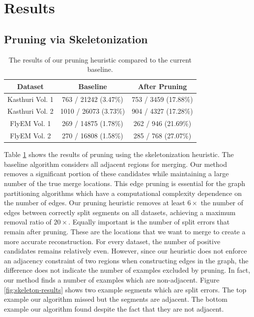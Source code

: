 \section{Results}

\subsection{Pruning via Skeletonization}

\begin{table}
	\centering
	\small
	\begin{tabular}{c c c} \hline
		\textbf{Dataset} & \textbf{Baseline} & \textbf{After Pruning} \\ \hline
		Kasthuri Vol. 1 & 763 / 21242 (3.47\%) & 753 / 3459 (17.88\%) \\
		Kasthuri Vol. 2 & 1010 / 26073 (3.73\%) & 904 / 4327 (17.28\%) \\
		FlyEM Vol. 1 & 269 / 14875 (1.78\%) & 262 / 946 (21.69\%) \\
		FlyEM Vol. 2 & 270 / 16808 (1.58\%) & 285 / 768 (27.07\%)\\ \hline
	\end{tabular}
	\caption{The results of our pruning heuristic compared to the current baseline.}
	\label{table:skeletonization}
\end{table}

Table \ref{table:skeletonization} shows the results of pruning using the skeletonization heuristic.
The baseline algorithm considers all adjacent regions for merging. 
Our method removes a significant portion of these candidates while maintaining a large number of the true merge locations.
This edge pruning is essential for the graph partitioning algorithms which have a computational complexity dependence on the number of edges. 
Our pruning heuristic removes at least $6\times$ the number of edges between correctly split segments on all datasets, achieving a maximum removal ratio of $20\times$. 
Equally important is the number of split errors that remain after pruning.
These are the locations that we want to merge to create a more accurate reconstruction.
For every dataset, the number of positive candidates remains relatively even. 
However, since our heuristic does not enforce an adjacency constraint of two regions when constructing edges in the graph, the difference does not indicate the number of examples excluded by pruning. 
In fact, our method finds a number of examples which are non-adjacent.
Figure \ref{fig:skeleton-results} shows two example segments which are split errors.
The top example our algorithm missed but the segments are adjacent. 
The bottom example our algorithm found despite the fact that they are not adjacent.

